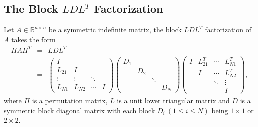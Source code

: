 \documentclass[11pt]{article}
\begin{document}
\subsection{The Block \texorpdfstring{$LDL^T$}{Lg} Factorization}
Let $A \in \mathbb{R}^{n \times n}$ be a symmetric indefinite matrix, the block $LDL^T$ factorization of $A$ takes the form 
\begin{eqnarray*}
\Pi A \Pi^T & = & LDL^T \\
& = & \begin{pmatrix}
I &  & & \\
L_{21} & I & & \\
\vdots & \vdots  &\ddots & \\
L_{N1} & L_{N2} & \cdots & I 
\end{pmatrix} \begin{pmatrix}
D_1  &  &  &  \\
&  D_2 &  &  \\
&  &  \ddots &  \\
&   &   &   D_N
\end{pmatrix} \begin{pmatrix}
I & L_{21}^T  & \cdots &  L_{N1}^T \\
& I  &  \cdots &  L_{N2}^T  \\
&   &  \ddots  & \vdots \\
&   &   & I
\end{pmatrix} 
,
\end{eqnarray*}
where $\Pi$ is a permutation matrix, $L$ is a unit lower triangular matrix and $D$ is a symmetric block diagonal matrix with each block $D_i~(1 \le i \le N)$ being $1 \times 1$ or $2 \times 2$.
\end{document}
